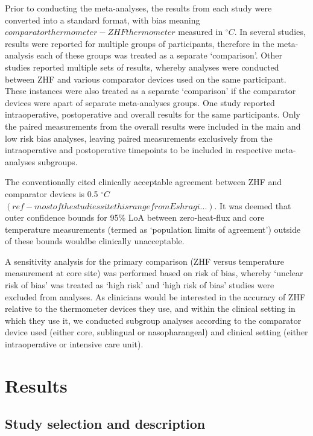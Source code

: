 \documentclass[smallextended]{svjour3}       %
\begin{document}
Prior to conducting the meta-analyses, the results from each study were
converted into a standard format, with bias meaning
\(comparator thermometer-ZHF thermometer\) measured in \(^\circ C\). In
several studies, results were reported for multiple groups of
participants, therefore in the meta-analysis each of these groups was
treated as a separate `comparison'. Other studies reported multiple sets
of results, whereby analyses were conducted between ZHF and various
comparator devices used on the same participant. These instances were
also treated as a separate `comparison' if the comparator devices were
apart of separate meta-analyses groups. One study reported
intraoperative, postoperative and overall results for the same
participants. Only the paired measurements from the overall results were
included in the main and low risk bias analyses, leaving paired
measurements exclusively from the intraoperative and postoperative
timepoints to be included in respective meta-analyses subgroups.

The conventionally cited clinically acceptable agreement between ZHF and
comparator devices is 0.5 \(^\circ C\)
\((ref - most of the studies site this range from Eshragi...)\). It was
deemed that outer confidence bounds for 95\% LoA between zero-heat-flux
and core temperature measurements (termed as `population limits of
agreement') outside of these bounds wouldbe clinically unacceptable.

A sensitivity analysis for the primary comparison (ZHF versus
temperature measurement at core site) was performed based on risk of
bias, whereby `unclear risk of bias' was treated as `high risk' and
`high risk of bias' studies were excluded from analyses. As clinicians
would be interested in the accuracy of ZHF relative to the thermometer
devices they use, and within the clinical setting in which they use it,
we conducted subgroup analyses according to the comparator device used
(either core, sublingual or nasopharangeal) and clinical setting (either
intraoperative or intensive care unit).

\hypertarget{results}{%
\section{Results}\label{results}}

\hypertarget{study-selection-and-description}{%
\subsection{Study selection and
description}\label{study-selection-and-description}}
\end{document}
